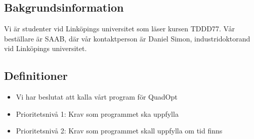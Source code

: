 \subsection{Bakgrundsinformation}
Vi är studenter vid Linköpings universitet som läser kursen TDDD77. Vår beställare är SAAB, där vår kontaktperson är Daniel Simon, industridoktorand vid Linköpings universitet. 

\subsection{Definitioner}

\begin{itemize}
\item{Vi har beslutat att kalla vårt program för QuadOpt}
\item{Prioritetsnivå 1: Krav som programmet ska uppfylla}
\item{Prioritetsnivå 2: Krav som programmet skall uppfylla om tid finns}
\end{itemize}
